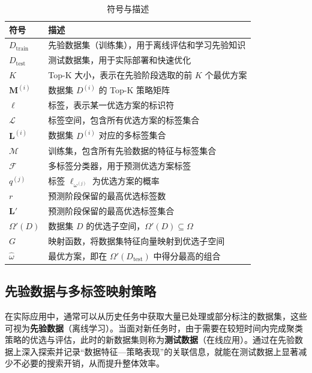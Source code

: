 \documentclass[10pt]{article} %
\numberwithin{equation}{section}
\begin{document}
\begin{table}[t]
\centering\small
\setlength{\tabcolsep}{6pt}
\renewcommand{\arraystretch}{1.15}
\caption{符号与描述}
\label{tab:symbols-advanced}
\begin{tabular}{ll}
\toprule
\textbf{符号} & \textbf{描述} \\
\midrule
$D_{\text{train}}$ & 先验数据集（训练集），用于离线评估和学习先验知识 \\
$D_{\text{test}}$ & 测试数据集，用于实际部署和快速优化 \\
$K$ & Top-K 大小，表示在先验阶段选取的前 $K$ 个最优方案 \\
$\mathbf{M}^{(i)}$ & 数据集 $D^{(i)}$ 的 Top-K 策略矩阵 \\
$\ell$ & 标签，表示某一优选方案的标识符 \\
$\mathcal{L}$ & 标签空间，包含所有优选方案的标签集合 \\
$\mathbf{L}^{(i)}$ & 数据集 $D^{(i)}$ 对应的多标签集合 \\
$\mathcal{M}$ & 训练集，包含所有先验数据的特征与标签集合 \\
$\mathcal{F}$ & 多标签分类器，用于预测优选方案标签 \\
$q^{(j)}$ & 标签 $\ell_{\omega^{(j)}}$ 为优选方案的概率 \\
$r$ & 预测阶段保留的最高优选标签数 \\
$\mathbf{L}'$ & 预测阶段保留的最高优选标签集合 \\
$\Omega'(D)$ & 数据集 $D$ 的优选子空间，$\Omega'(D) \subseteq \Omega$ \\
$G$ & 映射函数，将数据集特征向量映射到优选子空间 \\
$\hat{\omega}$ & 最优方案，即在 $\Omega'(D_{\text{test}})$ 中得分最高的组合 \\
\bottomrule
\end{tabular}
\end{table}

\subsection{先验数据与多标签映射策略}
\label{sec:prior-data-mapping}

在实际应用中，通常可以从历史任务中获取大量已处理或部分标注的数据集，这些可视为\textbf{先验数据}（离线学习）。当面对新任务时，由于需要在较短时间内完成聚类策略的优选与评估，此时的新数据集则称为\textbf{测试数据}（在线应用）。通过在先验数据上深入探索并记录“数据特征—策略表现”的关联信息，就能在测试数据上显著减少不必要的搜索开销，从而提升整体效率。
\end{document}
